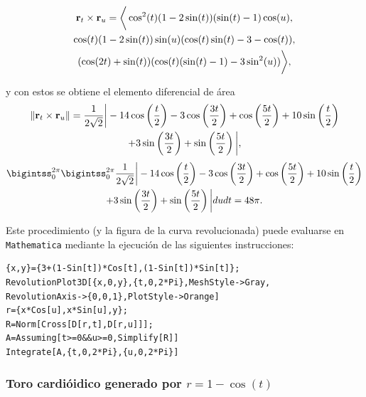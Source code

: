 \begingroup
\setlength{\abovedisplayskip}{0pt}
\setlength{\abovedisplayshortskip}{0pt}
\begin{multline*}
{\bf r}_{t}\times {\bf r}_{u}=\bigg\langle\cos^{2}(t)(1-2\sin(t))(\sin(t)-1)\cos(u),\\
\cos(t)(1-2\sin(t))\sin (u)(\cos(t)\sin(t)-3-\cos(t)),\\
(\cos(2t)+\sin(t))(\cos(t)(\sin(t)-1)-3\sin^{2}(u))\bigg\rangle,
\end{multline*}
\endgroup

y con estos se obtiene el elemento diferencial de área
\begin{multline*}
\left\|{\bf r}_{t}\times {\bf r}_{u}\right\|=\frac{1}{2\sqrt{2}}\bigg|-14\cos\left(\frac{t}{2}\right)-3\cos\left(\frac{3t}{2}\right)+\cos\left(\frac{5t}{2}\right)+10\sin\left(\frac{t}{2}\right)\\
+3\sin\left(\frac{3t}{2}\right)+\sin\left(\frac{5t}{2}\right)\bigg|,
\end{multline*}
\begin{multline*}
\bigintss_{0}^{2\pi}\bigintss_{0}^{2\pi}\frac{1}{2\sqrt{2}}\bigg|-14\cos\left(\frac{t}{2}\right)-3\cos\left(\frac{3t}{2}\right)+\cos\left(\frac{5t}{2}\right)+10\sin\left(\frac{t}{2}\right)\\
+3\sin\left(\frac{3t}{2}\right)+\sin\left(\frac{5t}{2}\right)\bigg|dudt=48\pi.
\end{multline*}

Este procedimiento (y la figura de la curva revolucionada) puede evaluarse en \verb"Mathematica"
mediante la ejecución de las siguientes instrucciones:

\begin{tcolorbox}[title=\bf Instrucción en \verb"Mathematica"]\begin{Verbatim}[formatcom=\letraverbatim]
{x,y}={3+(1-Sin[t])*Cos[t],(1-Sin[t])*Sin[t]};
RevolutionPlot3D[{x,0,y},{t,0,2*Pi},MeshStyle->Gray,
RevolutionAxis->{0,0,1},PlotStyle->Orange]
r={x*Cos[u],x*Sin[u],y};
R=Norm[Cross[D[r,t],D[r,u]]];
A=Assuming[t>=0&&u>=0,Simplify[R]]
Integrate[A,{t,0,2*Pi},{u,0,2*Pi}]
\end{Verbatim}
\end{tcolorbox}

\subsubsection{Toro cardióidico generado por \texorpdfstring{$r=1-\cos(t)$}{r=1-cos(t)}}

